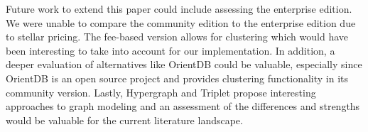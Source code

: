 Future work to extend this paper could include assessing the enterprise edition. We were unable to compare the community edition to the enterprise edition due to stellar pricing. The fee-based version allows for clustering which would have been interesting to take into account for our implementation. In addition, a deeper evaluation of alternatives like OrientDB could be valuable, especially since OrientDB is an open source project and provides clustering functionality in its community version. Lastly, Hypergraph and Triplet propose interesting approaches to graph modeling and an assessment of the differences and strengths would be valuable for the current literature landscape.
